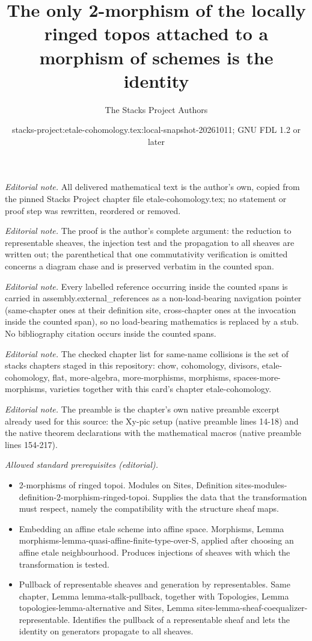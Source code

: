 \documentclass[10pt,a4paper]{amsart}
\title{The only 2-morphism of the locally ringed topos attached to a morphism of schemes is the identity}
\author{The Stacks Project Authors}
\date{stacks-project:etale-cohomology.tex:local-snapshot-20261011; GNU FDL 1.2 or later}
\theoremstyle{plain}
\theoremstyle{definition}
\theoremstyle{remark}
\numberwithin{equation}{subsection}
\begin{document}
\maketitle
\noindent\textit{Editorial note.} All delivered mathematical text is the author's own, copied from the pinned Stacks Project chapter file etale-cohomology.tex; no statement or proof step was rewritten, reordered or removed.\par\medskip
\noindent\textit{Editorial note.} The proof is the author's complete argument: the reduction to representable sheaves, the injection test and the propagation to all sheaves are written out; the parenthetical that one commutativity verification is omitted concerns a diagram chase and is preserved verbatim in the counted span.\par\medskip
\noindent\textit{Editorial note.} Every labelled reference occurring inside the counted spans is carried in assembly.external\_references as a non-load-bearing navigation pointer (same-chapter ones at their definition site, cross-chapter ones at the invocation inside the counted span), so no load-bearing mathematics is replaced by a stub. No bibliography citation occurs inside the counted spans.\par\medskip
\noindent\textit{Editorial note.} The checked chapter list for same-name collisions is the set of stacks chapters staged in this repository: chow, cohomology, divisors, etale-cohomology, flat, more-algebra, more-morphisms, morphisms, spaces-more-morphisms, varieties together with this card's chapter etale-cohomology.\par\medskip
\noindent\textit{Editorial note.} The preamble is the chapter's own native preamble excerpt already used for this source: the Xy-pic setup (native preamble lines 14-18) and the native theorem declarations with the mathematical macros (native preamble lines 154-217).\par\medskip
\noindent\textit{Allowed standard prerequisites (editorial).}\begin{itemize}
\item 2-morphisms of ringed topoi. Modules on Sites, Definition sites-modules-definition-2-morphism-ringed-topoi. Supplies the data that the transformation must respect, namely the compatibility with the structure sheaf maps.
\item Embedding an affine etale scheme into affine space. Morphisms, Lemma morphisms-lemma-quasi-affine-finite-type-over-S, applied after choosing an affine etale neighbourhood. Produces injections of sheaves with which the transformation is tested.
\item Pullback of representable sheaves and generation by representables. Same chapter, Lemma lemma-stalk-pullback, together with Topologies, Lemma topologies-lemma-alternative and Sites, Lemma sites-lemma-sheaf-coequalizer-representable. Identifies the pullback of a representable sheaf and lets the identity on generators propagate to all sheaves.
\end{itemize}\medskip
\end{document}
